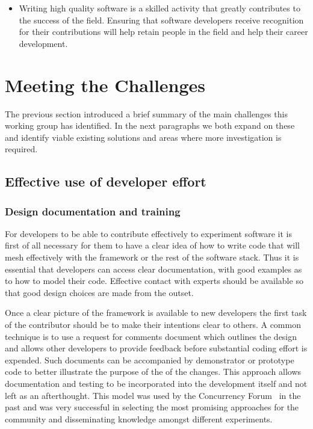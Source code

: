 \documentclass[12pt,a4paper]{article}
\begin{document}
\begin{itemize}
\item
    Writing high quality software is a skilled activity that greatly
  contributes to the success of the field. Ensuring that software
  developers receive recognition for their contributions will help
  retain people in the field and help their career development.
\end{itemize}

\hypertarget{meeting-the-challenges}{%
\section{Meeting the Challenges}\label{meeting-the-challenges}}

The previous section introduced a brief summary of the main challenges
this working group has identified. In the next paragraphs we both
expand on these and identify viable existing solutions and areas where
more investigation is required.

\hypertarget{effective-use-of-developer-effort}{%
\subsection{Effective use of developer
effort}\label{effective-use-of-developer-effort}}

\subsubsection{Design documentation and training}

For developers to be able to contribute effectively to experiment
software it is first of all necessary for them to have a clear idea of
how to write code that will mesh effectively with the framework or the
rest of the software stack. Thus it is essential that developers can
access clear documentation, with good examples as to how to model their
code. Effective contact with experts should be available so that good
design choices are made from the outset.

Once a clear picture of the framework is available to new developers the
first task of the contributor should be to make their intentions clear
to others. A common technique is to use a request for comments document
which outlines the design and allows other developers to provide
feedback before substantial coding effort is expended. Such documents
can be accompanied by demonstrator or prototype code to better
illustrate the purpose of the of the changes. This approach allows
documentation and testing to be incorporated into the development itself
and not left as an afterthought. This model was used by the Concurrency
Forum~\cite{ConcurrencyForum} in the past
and was very successful in selecting the most promising approaches for
the community and disseminating knowledge amongst different experiments.
\end{document}
